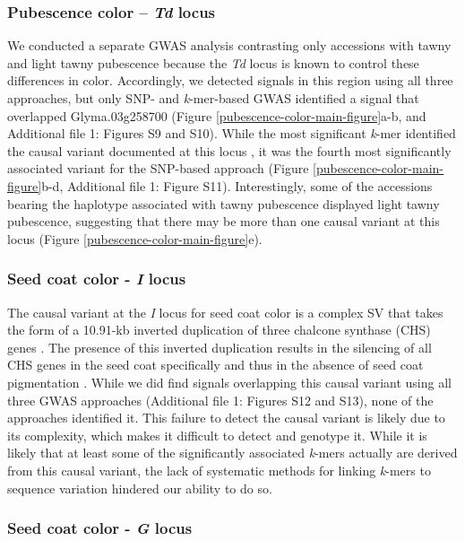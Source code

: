 \documentclass[doublespacing]{bmcart}
\begin{document}
\subsubsection*{Pubescence color -- \textit{Td} locus}

We conducted a separate GWAS analysis contrasting only accessions with tawny
and light tawny pubescence because the \textit{Td} locus is known to control
these differences in color. Accordingly, we detected signals in this region
using all three approaches, but only SNP- and \textit{k}-mer-based GWAS
identified a signal that overlapped Glyma.03g258700 (Figure
\ref{pubescence-color-main-figure}a-b, and Additional file 1: Figures S9 and
S10).  While the most significant
\textit{k}-mer identified the causal variant documented at this locus
\citep{yan2020}, it was the fourth most significantly associated variant for
the SNP-based approach (Figure \ref{pubescence-color-main-figure}b-d, Additional file 1: Figure 
S11).  Interestingly, some of the accessions
bearing the haplotype associated with tawny pubescence displayed light tawny
pubescence, suggesting that there may be more than one causal variant at this
locus (Figure \ref{pubescence-color-main-figure}e).

\subsubsection*{Seed coat color - \textit{I} locus}

The causal variant at the \textit{I} locus for seed coat color is a complex SV
that takes the form of a 10.91-kb inverted duplication of three chalcone
synthase (CHS) genes \citep[CHS1, CHS3 and CHS4;][]{tuteja2008}. The presence of
this inverted duplication results in the silencing of all CHS genes in the seed
coat specifically and thus in the absence of seed coat pigmentation
\citep{tuteja2009}. While we did find signals overlapping this causal variant
using all three GWAS approaches (Additional file 1: Figures S12 and
S13), none of the approaches identified
it. This failure to detect the causal variant is likely due
to its complexity, which makes it difficult to detect and genotype it. While it
is likely that at least some of the significantly associated \textit{k}-mers
actually are derived from this causal variant, the lack of systematic methods for
linking \textit{k}-mers to sequence variation hindered our ability to do so.

\subsubsection*{Seed coat color - \textit{G} locus}
\end{document}
